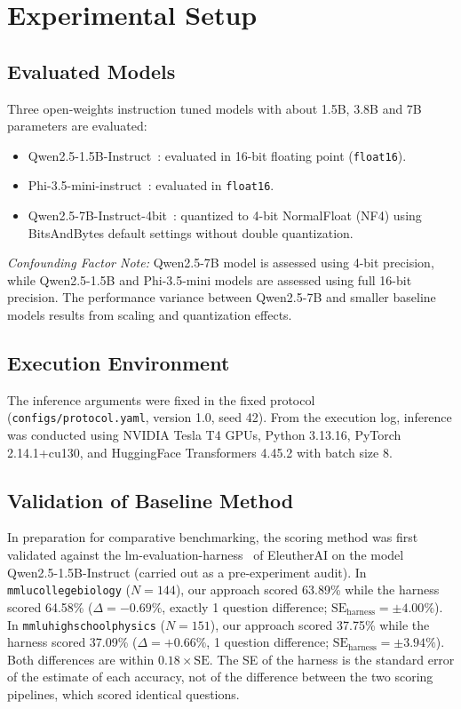 \documentclass[sigconf,nonacm]{acmart}
\makeatletter
\DeclareRobustCommand{\_}{\ifmmode\nfss@text{\textunderscore}\else\textunderscore\allowbreak\fi}
\newcommand{\protocolfile}{\texttt{configs/\allowbreak protocol.yaml}}
\makeatother
\begin{document}
\section{Experimental Setup}
\subsection{Evaluated Models}
Three open-weights instruction tuned models with about 1.5B, 3.8B and 7B parameters are evaluated:
\begin{itemize}
    \item \textsf{Qwen2.5-1.5B-Instruct}~\cite{qwen2024qwen25}: evaluated in 16-bit floating point (\texttt{float16}).
    \item \textsf{Phi-3.5-mini-instruct}~\cite{abdin2024phi3}: evaluated in \texttt{float16}.
    \item \textsf{Qwen2.5-7B-Instruct-4bit}~\cite{qwen2024qwen25,dettmers2023qlora}: quantized to 4-bit NormalFloat (NF4) using BitsAndBytes default settings without double quantization.
\end{itemize}
\textit{Confounding Factor Note:} \textsf{Qwen2.5-7B} model is assessed using 4-bit precision, while \textsf{Qwen2.5-1.5B} and \textsf{Phi-3.5-mini} models are assessed using full 16-bit precision. The performance variance between \textsf{Qwen2.5-7B} and smaller baseline models results from scaling and quantization effects.

\subsection{Execution Environment}
The inference arguments were fixed in the fixed protocol (\protocolfile, version 1.0, seed 42). From the execution log, inference was conducted using NVIDIA Tesla T4 GPUs, Python 3.13.16, PyTorch 2.14.1+cu130, and HuggingFace Transformers 4.45.2 with batch size 8.

\subsection{Validation of Baseline Method}
In preparation for comparative benchmarking, the scoring method was first validated against the \textsf{lm-evaluation-harness}~\cite{gao2023framework} of EleutherAI on the model \textsf{Qwen2.5-1.5B-Instruct} (carried out as a pre-experiment audit). In \texttt{mmlu\_college\_biology} ($N=144$), our approach scored 63.89\% while the harness scored 64.58\% ($\Delta = -0.69\%$, exactly 1 question difference; $\mathrm{SE}_{\mathrm{harness}} = \pm 4.00\%$). In \texttt{mmlu\_high\_school\_physics} ($N=151$), our approach scored 37.75\% while the harness scored 37.09\% ($\Delta = +0.66\%$, 1 question difference; $\mathrm{SE}_{\mathrm{harness}} = \pm 3.94\%$). Both differences are within $0.18 \times \mathrm{SE}$. The SE of the harness is the standard error of the estimate of each accuracy, not of the difference between the two scoring pipelines, which scored identical questions.
\end{document}
